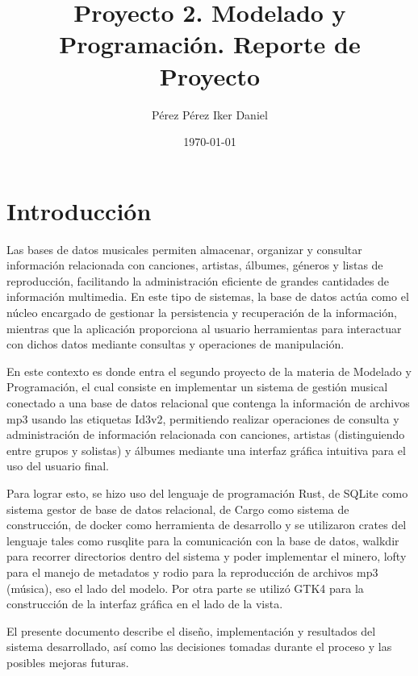 \documentclass[12pt]{article}
\title{Proyecto 2. Modelado y Programación. Reporte de Proyecto}
\author{Pérez Pérez Iker Daniel}
\date{\today}
\begin{document}
\maketitle
\thispagestyle{empty}

\newpage
\tableofcontents
\newpage

\section{Introducción}

Las bases de datos musicales permiten almacenar, organizar y consultar información relacionada con canciones, artistas, álbumes, géneros y listas de reproducción, facilitando la administración eficiente de grandes cantidades de información multimedia. En este tipo de sistemas, la base de datos actúa como el núcleo encargado de gestionar la persistencia y recuperación de la información, mientras que la aplicación proporciona al usuario herramientas para interactuar con dichos datos mediante consultas y operaciones de manipulación.

En este contexto es donde entra el segundo proyecto de la materia de Modelado y Programación, el cual consiste en implementar un sistema de gestión musical conectado a una base de datos relacional que contenga la información de archivos mp3 usando las etiquetas Id3v2, permitiendo realizar operaciones de consulta y administración de información relacionada con canciones, artistas (distinguiendo entre grupos y solistas) y álbumes mediante una interfaz gráfica intuitiva para el uso del usuario final.

Para lograr esto, se hizo uso del lenguaje de programación Rust, de SQLite como sistema gestor de base de datos relacional, de Cargo como sistema de construcción, de docker como herramienta de desarrollo y se utilizaron crates del lenguaje tales como rusqlite para la comunicación con la base de datos, walkdir para recorrer directorios dentro del sistema y poder implementar el minero, lofty para el manejo de metadatos y rodio para la reproducción de archivos mp3 (música), eso el lado del modelo. Por otra parte se utilizó GTK4 para la construcción de la interfaz gráfica en el lado de la vista.

El presente documento describe el diseño, implementación y resultados del sistema desarrollado, así como las decisiones tomadas durante el proceso y las posibles mejoras futuras.
\end{document}
